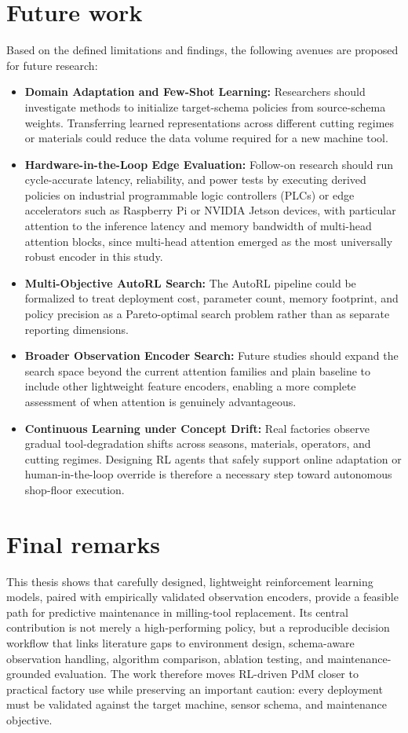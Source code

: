 \documentclass[12pt,oneside]{book}
\begin{document}
\section{Future work}
Based on the defined limitations and findings, the following avenues are proposed for future research:
\begin{itemize}
\item \textbf{Domain Adaptation and Few-Shot Learning:} Researchers should investigate methods to initialize target-schema policies from source-schema weights. Transferring learned representations across different cutting regimes or materials could reduce the data volume required for a new machine tool.
\item \textbf{Hardware-in-the-Loop Edge Evaluation:} Follow-on research should run cycle-accurate latency, reliability, and power tests by executing derived policies on industrial programmable logic controllers (PLCs) or edge accelerators such as Raspberry Pi or NVIDIA Jetson devices, with particular attention to the inference latency and memory bandwidth of multi-head attention blocks, since multi-head attention emerged as the most universally robust encoder in this study.
\item \textbf{Multi-Objective AutoRL Search:} The AutoRL pipeline could be formalized to treat deployment cost, parameter count, memory footprint, and policy precision as a Pareto-optimal search problem rather than as separate reporting dimensions.
\item \textbf{Broader Observation Encoder Search:} Future studies should expand the search space beyond the current attention families and plain baseline to include other lightweight feature encoders, enabling a more complete assessment of when attention is genuinely advantageous.
\item \textbf{Continuous Learning under Concept Drift:} Real factories observe gradual tool-degradation shifts across seasons, materials, operators, and cutting regimes. Designing RL agents that safely support online adaptation or human-in-the-loop override is therefore a necessary step toward autonomous shop-floor execution.
\end{itemize}

\section{Final remarks}
This thesis shows that carefully designed, lightweight reinforcement learning models, paired with empirically validated observation encoders, provide a feasible path for predictive maintenance in milling-tool replacement. Its central contribution is not merely a high-performing policy, but a reproducible decision workflow that links literature gaps to environment design, schema-aware observation handling, algorithm comparison, ablation testing, and maintenance-grounded evaluation. The work therefore moves RL-driven PdM closer to practical factory use while preserving an important caution: every deployment must be validated against the target machine, sensor schema, and maintenance objective.



\end{document}
